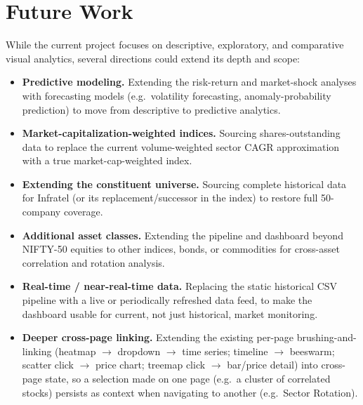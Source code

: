 \documentclass[14pt,a4paper]{extreport}
\begin{document}
\chapter{Future Work}

While the current project focuses on descriptive, exploratory, and
comparative visual analytics, several directions could extend its depth
and scope:

\begin{itemize}
    \item \textbf{Predictive modeling.} Extending the risk-return and
        market-shock analyses with forecasting models (e.g.\ volatility
        forecasting, anomaly-probability prediction) to move from
        descriptive to predictive analytics.
    \item \textbf{Market-capitalization-weighted indices.} Sourcing
        shares-outstanding data to replace the current volume-weighted
        sector CAGR approximation with a true market-cap-weighted index.
    \item \textbf{Extending the constituent universe.} Sourcing complete
        historical data for Infratel (or its replacement/successor in the
        index) to restore full 50-company coverage.
    \item \textbf{Additional asset classes.} Extending the pipeline and
        dashboard beyond NIFTY-50 equities to other indices, bonds, or
        commodities for cross-asset correlation and rotation analysis.
    \item \textbf{Real-time / near-real-time data.} Replacing the static
        historical CSV pipeline with a live or periodically refreshed data
        feed, to make the dashboard usable for current, not just
        historical, market monitoring.
    \item \textbf{Deeper cross-page linking.} Extending the existing
        per-page brushing-and-linking (heatmap \(\rightarrow\) dropdown
        \(\rightarrow\) time series; timeline \(\rightarrow\) beeswarm;
        scatter click \(\rightarrow\) price chart; treemap click
        \(\rightarrow\) bar/price detail) into cross-page state, so a
        selection made on one page (e.g.\ a cluster of correlated stocks)
        persists as context when navigating to another (e.g.\ Sector
        Rotation).
\end{itemize}
\end{document}
